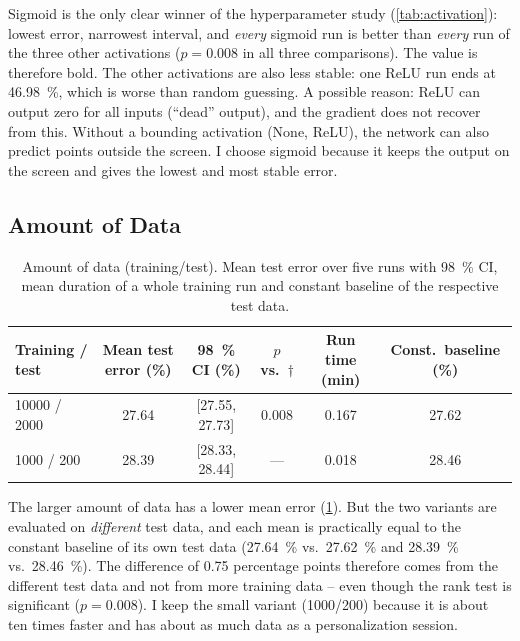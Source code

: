 Sigmoid is the only clear winner of the hyperparameter study
(\cref{tab:activation}): lowest error, narrowest interval, and \emph{every}
sigmoid run is better than \emph{every} run of the three other activations
($p=0.008$ in all three comparisons). The value is therefore bold. The other
activations are also less stable: one ReLU run ends at \SI{46.98}{\percent},
which is worse than random guessing. A possible reason: ReLU can output zero for
all inputs (\enquote{dead} output), and the gradient does not recover from
this. Without a bounding activation (None, ReLU), the network can also predict
points outside the screen. I choose sigmoid because it keeps the output on the
screen and gives the lowest and most stable error.

\subsection{Amount of Data}
\label{sec:size}

\begin{table}[htbp]
  \centering
  \caption[Amount of data (training/test)]{Amount of data (training/test). Mean test error over five runs
           with \SI{98}{\percent} CI, mean duration of a whole training run and
           constant baseline of the respective test data.}
  \label{tab:dataset_size}
  \small
  \setlength{\tabcolsep}{3.5pt}
  \begin{tabular}{lccccc}
    \toprule
    Training / test & Mean test error (\%) & \SI{98}{\percent} CI (\%) & $p$ vs.\ $\dagger$ & Run time (min) & Const.\ baseline (\%) \\
    \midrule
    \num{10000} / \num{2000}      & 27.64 & [27.55, 27.73] & 0.008 & 0.167 & 27.62 \\
    \num{1000} / \num{200}\sel{}  & 28.39 & [28.33, 28.44] & ---   & 0.018 & 28.46 \\
    \bottomrule
  \end{tabular}
\end{table}

The larger amount of data has a lower mean error (\cref{tab:dataset_size}). But
the two variants are evaluated on \emph{different} test data, and each mean is
practically equal to the constant baseline of its own test data
(\SI{27.64}{\percent} vs.\ \SI{27.62}{\percent} and \SI{28.39}{\percent} vs.\
\SI{28.46}{\percent}). The difference of \num{0.75} percentage points therefore
comes from the different test data and not from more training data -- even
though the rank test is significant ($p=0.008$). I keep the small variant
(\num{1000}/\num{200}) because it is about ten times faster and has about as
much data as a personalization session.


